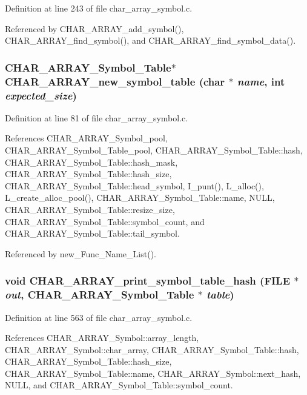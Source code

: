 Definition at line 243 of file char\_\-array\_\-symbol.c.

Referenced by CHAR\_\-ARRAY\_\-add\_\-symbol(), CHAR\_\-ARRAY\_\-find\_\-symbol(), and CHAR\_\-ARRAY\_\-find\_\-symbol\_\-data().
\subsubsection{\setlength{\rightskip}{0pt plus 5cm}\bf{CHAR\_\-ARRAY\_\-Symbol\_\-Table}$\ast$ CHAR\_\-ARRAY\_\-new\_\-symbol\_\-table (char $\ast$ {\em name}, int {\em expected\_\-size})}\label{char__array__symbol_8c_092b50cb132d4edfa42c9fdbd1496444}




Definition at line 81 of file char\_\-array\_\-symbol.c.

References CHAR\_\-ARRAY\_\-Symbol\_\-pool, CHAR\_\-ARRAY\_\-Symbol\_\-Table\_\-pool, CHAR\_\-ARRAY\_\-Symbol\_\-Table::hash, CHAR\_\-ARRAY\_\-Symbol\_\-Table::hash\_\-mask, CHAR\_\-ARRAY\_\-Symbol\_\-Table::hash\_\-size, CHAR\_\-ARRAY\_\-Symbol\_\-Table::head\_\-symbol, I\_\-punt(), L\_\-alloc(), L\_\-create\_\-alloc\_\-pool(), CHAR\_\-ARRAY\_\-Symbol\_\-Table::name, NULL, CHAR\_\-ARRAY\_\-Symbol\_\-Table::resize\_\-size, CHAR\_\-ARRAY\_\-Symbol\_\-Table::symbol\_\-count, and CHAR\_\-ARRAY\_\-Symbol\_\-Table::tail\_\-symbol.

Referenced by new\_\-Func\_\-Name\_\-List().
\subsubsection{\setlength{\rightskip}{0pt plus 5cm}void CHAR\_\-ARRAY\_\-print\_\-symbol\_\-table\_\-hash (FILE $\ast$ {\em out}, \bf{CHAR\_\-ARRAY\_\-Symbol\_\-Table} $\ast$ {\em table})}\label{char__array__symbol_8c_5a537deea026b3c1ae109bacd5c7b349}




Definition at line 563 of file char\_\-array\_\-symbol.c.

References CHAR\_\-ARRAY\_\-Symbol::array\_\-length, CHAR\_\-ARRAY\_\-Symbol::char\_\-array, CHAR\_\-ARRAY\_\-Symbol\_\-Table::hash, CHAR\_\-ARRAY\_\-Symbol\_\-Table::hash\_\-size, CHAR\_\-ARRAY\_\-Symbol\_\-Table::name, CHAR\_\-ARRAY\_\-Symbol::next\_\-hash, NULL, and CHAR\_\-ARRAY\_\-Symbol\_\-Table::symbol\_\-count.
